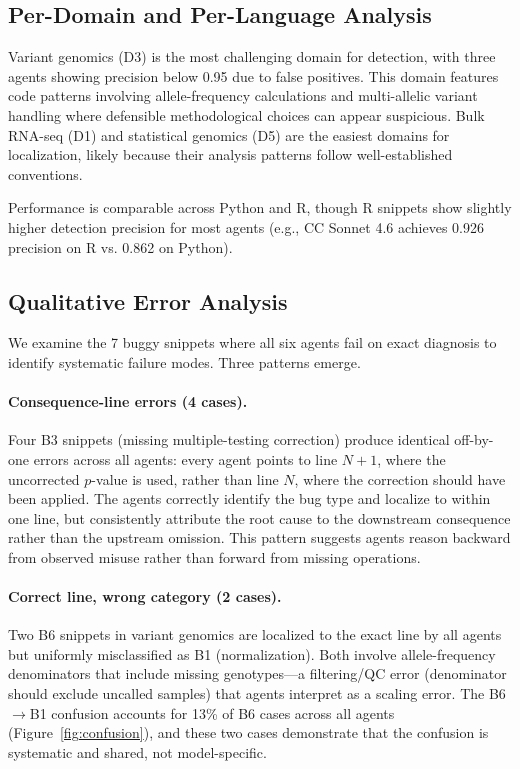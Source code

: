 \documentclass[11pt]{article}
\begin{document}
\subsection{Per-Domain and Per-Language Analysis}

Variant genomics (D3) is the most challenging domain for detection, with three agents showing precision below 0.95 due to false positives. This domain features code patterns involving allele-frequency calculations and multi-allelic variant handling where defensible methodological choices can appear suspicious. Bulk RNA-seq (D1) and statistical genomics (D5) are the easiest domains for localization, likely because their analysis patterns follow well-established conventions.

Performance is comparable across Python and R, though R snippets show slightly higher detection precision for most agents (e.g., CC Sonnet 4.6 achieves 0.926 precision on R vs. 0.862 on Python).

\subsection{Qualitative Error Analysis}

We examine the 7 buggy snippets where all six agents fail on exact diagnosis to identify systematic failure modes. Three patterns emerge.

\paragraph{Consequence-line errors (4 cases).}
Four B3 snippets (missing multiple-testing correction) produce identical off-by-one errors across all agents: every agent points to line $N+1$, where the uncorrected $p$-value is used, rather than line $N$, where the correction should have been applied. The agents correctly identify the bug type and localize to within one line, but consistently attribute the root cause to the downstream consequence rather than the upstream omission. This pattern suggests agents reason backward from observed misuse rather than forward from missing operations.

\paragraph{Correct line, wrong category (2 cases).}
Two B6 snippets in variant genomics are localized to the exact line by all agents but uniformly misclassified as B1 (normalization). Both involve allele-frequency denominators that include missing genotypes---a filtering/QC error (denominator should exclude uncalled samples) that agents interpret as a scaling error. The B6$\to$B1 confusion accounts for 13\% of B6 cases across all agents (Figure~\ref{fig:confusion}), and these two cases demonstrate that the confusion is systematic and shared, not model-specific.
\end{document}
